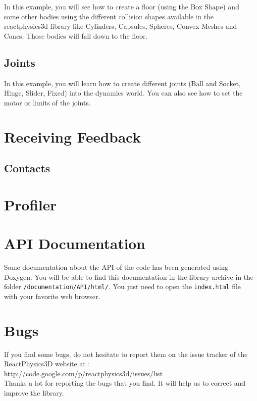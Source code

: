 \documentclass[a4paper,12pt]{article}
\begin{document}
    In this example, you will see how to create a floor (using the Box Shape) and some other bodies using the different collision shapes available
    in the reactphysics3d library like Cylinders, Capsules, Spheres, Convex Meshes and Cones. Those bodies will fall down to the floor.

    \subsection{Joints}

    In this example, you will learn how to create different joints (Ball and Socket, Hinge, Slider, Fixed) into the dynamics world. You can also see how
    to set the motor or limits of the joints.

    \section{Receiving Feedback}

    \subsection{Contacts}

    \section{Profiler}

   \section{API Documentation}

   Some documentation about the API of the code has been generated
   using Doxygen. You will be able to find this documentation in the library archive in the folder \texttt{/documentation/API/html/}. You just
   need to open the \texttt{index.html} file with your favorite web browser.

    \section{Bugs}

    If you find some bugs, do not hesitate to report them on the issue tracker of the ReactPhysics3D website at : \\

    \url{http://code.google.com/p/reactphysics3d/issues/list} \\

    Thanks a lot for reporting the bugs that you find. It will help us to correct and improve the library.
   
\end{document}

